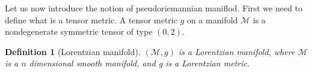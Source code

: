 \documentclass[10pt]{book}
\newcommand{\Mcal}{\mathcal{M}}
\newcommand{\Rbb}{\mathbb{R}}
\theoremstyle{break}
\newtheorem{definition}{Definition}
\begin{document}
\bigskip


Let us now introduce the notion of pseudoriemannian maniflod. First we need to define what is a tensor metric. A tensor metric $g$ on a manifold $\Mcal$ is a nondegenerate symmetric tensor of type $(0,2)$.



%
%
%
%








\begin{definition}[Lorentzian manifold]
$(\Mcal,g)$ is a Lorentzian manifold, where $\Mcal$ is a $n$ dimensional smooth manifold, and g is a Lorentzian metric.
\end{definition}


\end{document}
